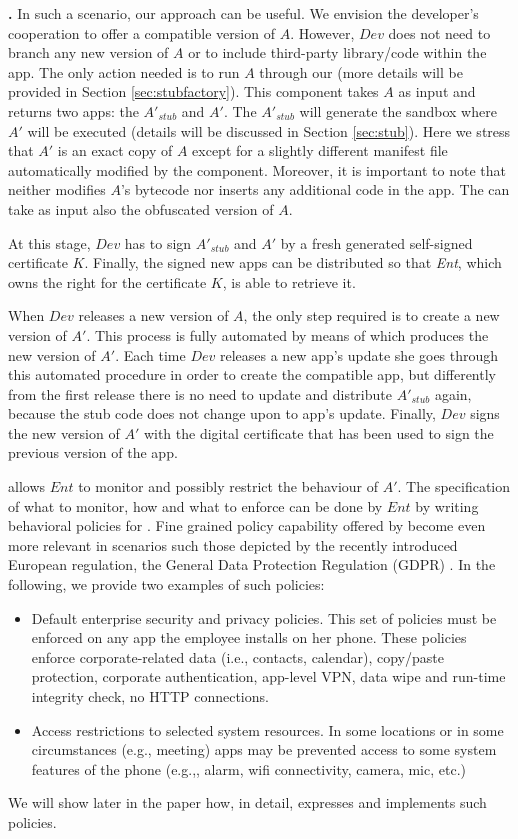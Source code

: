 \textbf{\asd.} In such a scenario, our approach can be useful. We envision the developer's cooperation to offer a \asd compatible version of $A$. 
However, $Dev$ does not need to branch any new version of $A$ or to include third-party library/code within the app. The only action needed is to run $A$ through our \stubMaker (more details will be provided in Section \ref{sec:stubfactory}).  This component takes $A$ as input and returns two apps: the \stub $A'_{stub}$  and $A'$. The $A'_{stub}$ will generate the sandbox where $A'$ will be executed (details will be discussed in Section \ref{sec:stub}). Here we stress that $A'$ is an exact copy of $A$ except for a slightly different manifest file automatically modified by the \stubMaker component. Moreover, it is important to note that \stubMaker neither  modifies $A$'s bytecode nor inserts any additional code in the app. The \stubMaker can take as input also the obfuscated version of $A$. 

At this stage, $Dev$ has to sign $A'_{stub}$ and $A'$ by a fresh generated self-signed certificate $K$. Finally, the signed new apps can be distributed so that \textit{Ent}, which owns the right for the certificate $K$, is able to retrieve it. 

When $Dev$ releases a new version of $A$, the only step required is to create a new version of $A'$. This process is fully automated by means of  \stubMaker which produces the new version of $A'$. Each time $Dev$ releases a new app's update she goes through this automated procedure in order to create the \asd compatible app, but differently from the first release there is no need to update and distribute $A'_{stub}$ again, because the stub code does not change upon to app's update. Finally, $Dev$ signs the new version of $A'$ with the digital certificate that has been used to sign the previous version of the app. 

\asd allows $Ent$ to monitor and possibly restrict the behaviour of $A'$. The specification of what to monitor, how and what to enforce can be done by $Ent$ by writing behavioral policies for \asd. Fine grained policy capability offered by \asd 
become even more relevant in scenarios such those depicted by the recently introduced European regulation, the General Data Protection Regulation (GDPR) \cite{gdpr}. In the following, we provide two examples of such policies: 

\begin{itemize}
\item Default enterprise security and privacy policies. This set of policies must be enforced on any app the employee installs on her phone. These policies enforce corporate-related data (i.e., contacts, calendar), copy/paste protection, corporate authentication, app-level VPN, data wipe and run-time integrity check, no HTTP connections.

\item Access restrictions to selected system resources. In some locations or in some circumstances (e.g., meeting) apps may be prevented access to some system features of the phone (e.g.,, alarm, wifi connectivity, camera, mic, etc.) 

\end{itemize}
We will show later in the paper how, in detail,  \asd  expresses and  implements such policies.
